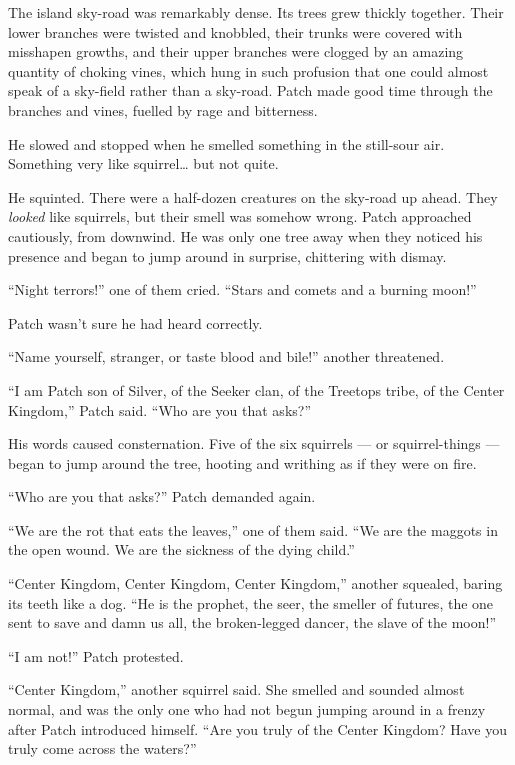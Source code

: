 \documentclass[ebook,oneside,openany,17pt]{memoir}
\newenvironment{tolerant}[1]{%
  \par\tolerance=#1\relax
}{%
  \par
}
\begin{document}
\begin{tolerant}{1000}
The island sky-road was remarkably dense. Its trees grew thickly
together. Their lower branches were twisted and knobbled, their trunks
were covered with misshapen growths, and their upper branches were
clogged by an amazing quantity of choking vines, which hung in such
profusion that one could almost speak of a sky-field rather than a
sky-road. Patch made good time through the branches and vines, fuelled
by rage and bitterness.
\end{tolerant}

He slowed and stopped when he smelled something in the still-sour
air. Something very like squirrel… but not quite.

He squinted. There were a half-dozen creatures on the sky-road up
ahead. They \emph{looked} like squirrels, but their smell was
somehow wrong. Patch approached cautiously, from downwind. He was only
one tree away when they noticed his presence and began to jump around
in surprise, chittering with dismay.

“Night terrors!” one of them cried. “Stars and comets and a burning
moon!”

Patch wasn’t sure he had heard correctly.

“Name yourself, stranger, or taste blood and bile!” another
threatened.

“I am Patch son of Silver, of the Seeker clan, of the Treetops tribe,
of the Center Kingdom,” Patch said. “Who are you that asks?”

\begin{tolerant}{1000}
His words caused consternation. Five of the six squirrels — or
squirrel-things — began to jump around the tree, hooting and writhing
as if they were on fire.
\end{tolerant}

“Who are you that asks?” Patch demanded again.

“We are the rot that eats the leaves,” one of them said. “We are the
maggots in the open wound. We are the sickness of the dying child.”

“Center Kingdom, Center Kingdom, Center Kingdom,” another squealed,
baring its teeth like a dog. “He is the prophet, the seer, the smeller
of futures, the one sent to save and damn us all, the broken-legged
dancer, the slave of the moon!”

“I am not!” Patch protested.

\begin{tolerant}{2000}
“Center Kingdom,” another squirrel said. She smelled and sounded
almost normal, and was the only one who had not begun jumping around
in a frenzy after Patch introduced himself. “Are you truly of the
Center Kingdom? Have you truly come across the waters?”
\end{tolerant}
\end{document}
